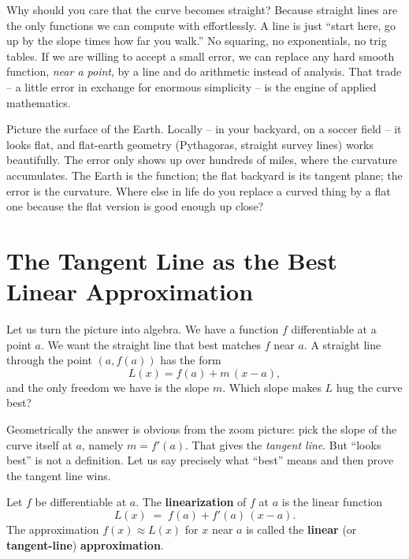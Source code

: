 Why should you care that the curve becomes straight? Because straight lines are
the only functions we can compute with effortlessly. A line is just ``start
here, go up by the slope times how far you walk.'' No squaring, no exponentials,
no trig tables. If we are willing to accept a small error, we can replace any
hard smooth function, \emph{near a point}, by a line and do arithmetic instead of
analysis. That trade -- a little error in exchange for enormous simplicity -- is
the engine of applied mathematics.

\begin{walkbox}
Picture the surface of the Earth. Locally -- in your backyard, on a soccer field
-- it looks flat, and flat-earth geometry (Pythagoras, straight survey lines)
works beautifully. The error only shows up over hundreds of miles, where the
curvature accumulates. The Earth is the function; the flat backyard is its
tangent plane; the error is the curvature. Where else in life do you replace a
curved thing by a flat one because the flat version is good enough up close?
\end{walkbox}

\section{The Tangent Line as the Best Linear Approximation}
\label{ch14:tangent-best}

Let us turn the picture into algebra. We have a function $f$ differentiable at a
point $a$. We want the straight line that best matches $f$ near $a$. A straight
line through the point $(a,f(a))$ has the form
\[
L(x) = f(a) + m\,(x-a),
\]
and the only freedom we have is the slope $m$. Which slope makes $L$ hug the
curve best?

Geometrically the answer is obvious from the zoom picture: pick the slope of the
curve itself at $a$, namely $m=f'(a)$. That gives the \emph{tangent line}. But
``looks best'' is not a definition. Let us say precisely what ``best'' means and
then prove the tangent line wins.

\begin{definition}[Linearization]
\label{ch14:def-linearization}
Let $f$ be differentiable at $a$. The \textbf{linearization} of $f$ at $a$ is the
linear function
\[
L(x) \;=\; f(a) + f'(a)\,(x-a).
\]
The approximation $f(x)\approx L(x)$ for $x$ near $a$ is called the
\textbf{linear} (or \textbf{tangent-line}) \textbf{approximation}.
\end{definition}

